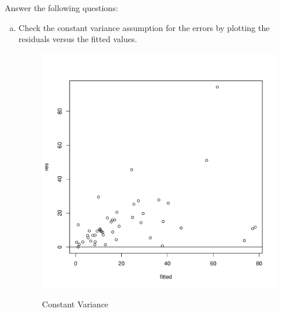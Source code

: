 \documentclass[12pt,letterpaper]{article}
\begin{document}
\vspace{.5cm}
  
\vspace{.5cm}
Answer the following questions:
\vspace{.5cm}
\begin{enumerate}[(a)]
	 \item Check the constant variance assumption for the errors by plotting the residuals versus the fitted values. \\
	  
	\begin{figure}[h!]\centering
		\caption{\footnotesize Constant Variance}\vspace{-1cm}
		\label{fig:a}
		\includegraphics[width=.85\textwidth]{a.pdf}\\
	\end{figure}


\end{enumerate}
\end{document}
